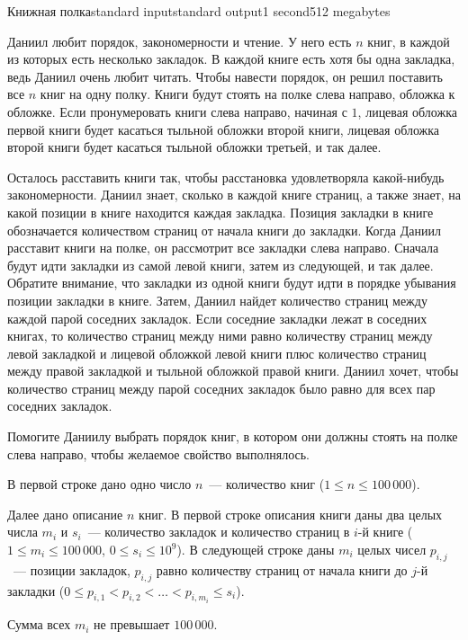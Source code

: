 \begin{problem}{Книжная полка}{standard input}{standard output}{1 second}{512 megabytes}

Даниил любит порядок, закономерности и чтение. У него есть $n$ книг, в каждой из которых есть несколько закладок. В каждой книге есть хотя бы одна закладка, ведь Даниил очень любит читать. Чтобы навести порядок, он решил поставить все $n$ книг на одну полку. Книги будут стоять на полке слева направо, обложка к обложке. Если пронумеровать книги слева направо, начиная с $1$, лицевая обложка первой книги будет касаться тыльной обложки второй книги, лицевая обложка второй книги будет касаться тыльной обложки третьей, и так далее. 

Осталось расставить книги так, чтобы расстановка удовлетворяла какой-нибудь закономерности. Даниил знает, сколько в каждой книге страниц, а также знает, на какой позиции в книге находится каждая закладка. Позиция закладки в книге обозначается количеством страниц от начала книги до закладки. Когда Даниил расставит книги на полке, он рассмотрит все закладки слева направо. Сначала будут идти закладки из самой левой книги, затем из следующей, и так далее. Обратите внимание, что закладки из одной книги будут идти в порядке убывания позиции закладки в книге. Затем, Даниил найдет количество страниц между каждой парой соседних закладок. Если соседние закладки лежат в соседних книгах, то количество страниц между ними равно количеству страниц между левой закладкой и лицевой обложкой левой книги плюс количество страниц между правой закладкой и тыльной обложкой правой книги. Даниил хочет, чтобы количество страниц между парой соседних закладок было равно для всех пар соседних закладок.

Помогите Даниилу выбрать порядок книг, в котором они должны стоять на полке слева направо, чтобы желаемое свойство выполнялось.

\InputFile
В первой строке дано одно число $n$~--- количество книг ($1 \le n \le 100\,000$).

Далее дано описание $n$ книг. В первой строке описания книги даны два целых числа $m_i$ и $s_i$~--- количество закладок и количество страниц в $i$-й книге ($1 \le m_i \le 100\,000$, $0 \le s_i \le 10^9$). В следующей строке даны $m_i$ целых чисел $p_{i, j}$~--- позиции закладок, $p_{i, j}$ равно количеству страниц от начала книги до $j$-й закладки ($0 \le p_{i, 1} < p_{i, 2} < \dots < p_{i, m_i} \le s_i$).

Сумма всех $m_i$ не превышает $100\,000$.


\end{problem}
